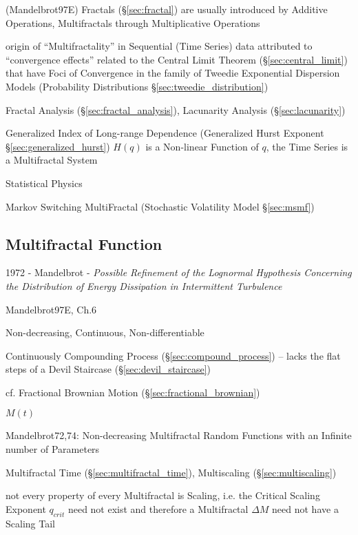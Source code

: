(Mandelbrot97E) Fractals (\S\ref{sec:fractal}) are usually introduced by
Additive Operations, Multifractals through Multiplicative Operations

origin of ``Multifractality'' in Sequential (Time Series) data attributed to
``convergence effects'' related to the Central Limit Theorem
(\S\ref{sec:central_limit}) that have Foci of Convergence in the family of
Tweedie Exponential Dispersion Models (Probability Distributions
\S\ref{sec:tweedie_distribution})

Fractal Analysis (\S\ref{sec:fractal_analysis}), Lacunarity Analysis
(\S\ref{sec:lacunarity})

Generalized Index of Long-range Dependence (Generalized Hurst Exponent
\S\ref{sec:generalized_hurst}) $H(q)$ is a Non-linear Function of $q$, the Time
Series is a Multifractal System

Statistical Physics

\fist Markov Switching MultiFractal (Stochastic Volatility Model
\S\ref{sec:msmf})



\subsection{Multifractal Function}\label{sec:multifractal_function}

1972 - Mandelbrot - \emph{Possible Refinement of the Lognormal Hypothesis
  Concerning the Distribution of Energy Dissipation in Intermittent Turbulence}

Mandelbrot97E, Ch.6

Non-decreasing, Continuous, Non-differentiable

Continuously Compounding Process (\S\ref{sec:compound_process})
-- lacks the flat steps of a Devil Staircase (\S\ref{sec:devil_staircase})

cf. Fractional Brownian Motion (\S\ref{sec:fractional_brownian})

$M(t)$

Mandelbrot72,74: Non-decreasing Multifractal Random Functions with an Infinite
number of Parameters

Multifractal Time (\S\ref{sec:multifractal_time}), Multiscaling
(\S\ref{sec:multiscaling})

not every property of every Multifractal is Scaling, i.e. the Critical Scaling
Exponent $q_{crit}$ need not exist and therefore a Multifractal $\Delta M$ need
not have a Scaling Tail



